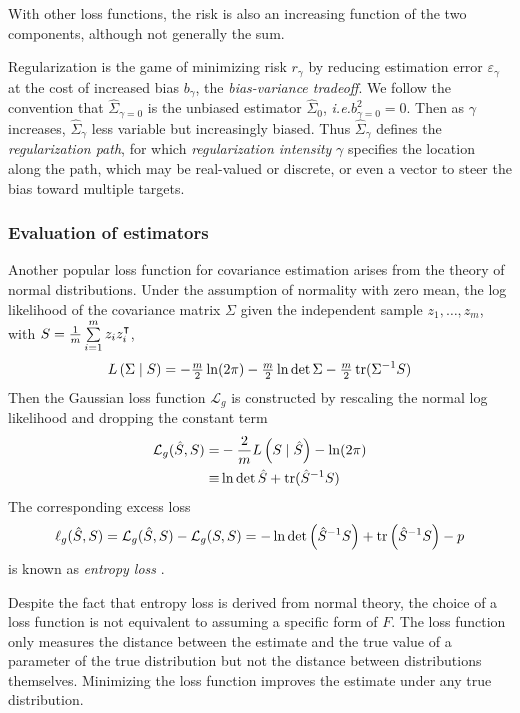 With other loss functions, the risk is also an increasing function of the two components, although not generally the sum.

Regularization is the game of minimizing risk $r_\gamma$ by reducing estimation error $\varepsilon_\gamma$ at the cost of increased bias $b_\gamma$, the \emph{bias-variance tradeoff}.  
We follow the convention that $\hat\Sigma_{\gamma=0}$ is the unbiased estimator $\hat\Sigma_0$, \emph{i.e.}\;$b_{\gamma=0}^2 = 0$.  Then as $\gamma$ increases, $\hat\Sigma_\gamma$ less variable but increasingly biased.  Thus $\hat\Sigma_\gamma$ defines the \emph{regularization path}, for which \emph{regularization intensity} $\gamma$ specifies the location along the path, which may be real-valued or discrete, or even a vector to steer the bias toward multiple targets.  

\subsubsection{Evaluation of estimators}
Another popular loss  function for covariance estimation arises from the theory of normal distributions.  Under the assumption of normality  with zero mean, the log likelihood of the covariance matrix $\Sigma$ given the independent sample $z_1,\ldots,z_m$, with $S = \tfrac 1 m \sum\limits_{i=1}^m z_i z_i^\intercal$,  
\begin{equation}
L\left(\Sigma \mid S\right) = -\tfrac m 2 \ln(2\pi) - \tfrac m 2 \ln \det \Sigma - \tfrac m 2 \operatorname{tr}(\Sigma^{-1} S)
\end{equation}
Then the Gaussian loss function $\mathcal L_g$ is constructed by rescaling the normal log likelihood and dropping the constant term
\begin{equation}
\begin{split}
\mathcal L_g(\hat S,S) = &-\frac 2 m L\left(S \mid \hat S \right) - \ln(2\pi) 
\\ 
\equiv & \ln \det \hat S + \operatorname{tr}(\hat S^{-1} S) 
\end{split}
\end{equation}
The corresponding excess loss 
\begin{equation}
\ell_g(\hat S,S) = \mathcal L_g(\hat S,S) - \mathcal L_g(S,S) 
= -\ln \det \left(\hat S^{-1} S\right) + \operatorname{tr}\left(\hat S^{-1}S\right) - p
\end{equation}
is known as \emph{entropy loss} \citep{James:1961}.

Despite the fact that entropy loss is derived from normal theory, the choice of a loss function is not equivalent to assuming a specific form of $F$. The loss function only measures the distance between the estimate and the true value of a parameter of the true distribution but not the distance between distributions themselves. Minimizing the loss function improves the estimate under any true distribution.

